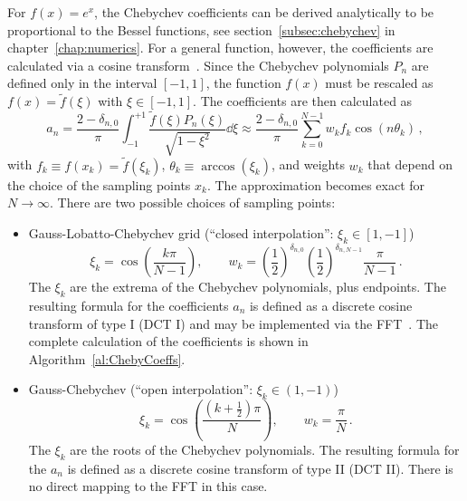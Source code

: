 For $f(x) = e^{x}$, the Chebychev coefficients can be derived analytically
to be proportional to the Bessel functions, see
section~\ref{subsec:chebychev} in chapter~\ref{chap:numerics}. For a general
function, however, the coefficients are calculated via a cosine
transform~\cite{NdongJCP09}. Since the Chebychev polynomials $P_n$ are defined
only in the interval $[-1, 1]$, the function $f(x)$ must be rescaled as $f(x)
= \tilde{f}(\xi)$ with $\xi \in [-1,1]$. The coefficients are then calculated as
\begin{equation}
  a_n = \frac{2 - \delta_{n,0}}{\pi}
        \int_{-1}^{+1} \frac{\tilde{f}(\xi) P_n(\xi)}{\sqrt{1-\xi^2}} \dd \xi
      \approx \frac{2 - \delta_{n,0}}{\pi}
        \sum_{k=0}^{N-1} w_k f_k \cos\left( n \theta_k \right)\,,
\end{equation}
with $f_k \equiv f(x_k) = \tilde{f}(\xi_k)$, $\theta_k \equiv \arccos(\xi_k)$,
and weights $w_k$ that depend on the choice of the sampling points $x_k$.
The approximation becomes exact for $N \rightarrow \infty$.
There are two possible choices of sampling points:
\begin{itemize}

  \item Gauss-Lobatto-Chebychev grid
        (``closed interpolation'': $\xi_k \in [1, -1]$)
  \begin{equation}
    \xi_k = \cos\left( \frac{k \pi}{N-1}
                \right), \qquad
    w_k = \left(\frac{1}{2}\right)^{\delta_{n,0}}
          \left(\frac{1}{2}\right)^{\delta_{n,N-1}}
          \frac{\pi}{N-1}\,.
    \label{eq:gauss_lobatto}
  \end{equation}
  The $\xi_k$ are the extrema of the Chebychev polynomials, plus
  endpoints. The resulting formula for the coefficients $a_n$ is defined as
  a discrete cosine transform of type I (DCT I) and may be implemented via the
  FFT~\cite{RaoDCTBook1990}. The complete calculation of the coefficients is
  shown in Algorithm~\ref{al:ChebyCoeffs}.

  \item Gauss-Chebychev (``open interpolation'': $\xi_k \in (1, -1)$)
  \begin{equation}
    \xi_k = \cos\left( \frac{\left(k + \frac{1}{2}\right) \pi}{N}
                \right), \qquad
    w_k = \frac{\pi}{N}\,.
    \label{eq:gauss_cheby}
  \end{equation}
  The $\xi_k$ are the roots of the Chebychev polynomials. The resulting
  formula for the $a_n$ is defined as a discrete cosine transform of type II
  (DCT II). There is no direct mapping to the FFT in this case.
\end{itemize}

